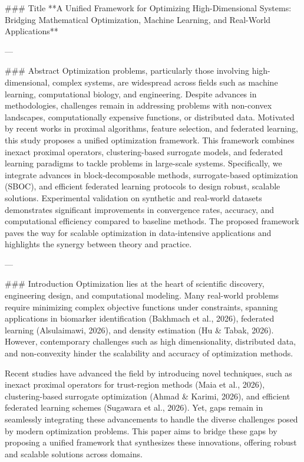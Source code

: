 ### Title
**A Unified Framework for Optimizing High-Dimensional Systems: Bridging Mathematical Optimization, Machine Learning, and Real-World Applications**

---

### Abstract
Optimization problems, particularly those involving high-dimensional, complex systems, are widespread across fields such as machine learning, computational biology, and engineering. Despite advances in methodologies, challenges remain in addressing problems with non-convex landscapes, computationally expensive functions, or distributed data. Motivated by recent works in proximal algorithms, feature selection, and federated learning, this study proposes a unified optimization framework. This framework combines inexact proximal operators, clustering-based surrogate models, and federated learning paradigms to tackle problems in large-scale systems. Specifically, we integrate advances in block-decomposable methods, surrogate-based optimization (SBOC), and efficient federated learning protocols to design robust, scalable solutions. Experimental validation on synthetic and real-world datasets demonstrates significant improvements in convergence rates, accuracy, and computational efficiency compared to baseline methods. The proposed framework paves the way for scalable optimization in data-intensive applications and highlights the synergy between theory and practice.

---

### Introduction
Optimization lies at the heart of scientific discovery, engineering design, and computational modeling. Many real-world problems require minimizing complex objective functions under constraints, spanning applications in biomarker identification (Bakhmach et al., 2026), federated learning (Alsulaimawi, 2026), and density estimation (Hu & Tabak, 2026). However, contemporary challenges such as high dimensionality, distributed data, and non-convexity hinder the scalability and accuracy of optimization methods.

Recent studies have advanced the field by introducing novel techniques, such as inexact proximal operators for trust-region methods (Maia et al., 2026), clustering-based surrogate optimization (Ahmad & Karimi, 2026), and efficient federated learning schemes (Sugawara et al., 2026). Yet, gaps remain in seamlessly integrating these advancements to handle the diverse challenges posed by modern optimization problems. This paper aims to bridge these gaps by proposing a unified framework that synthesizes these innovations, offering robust and scalable solutions across domains.

